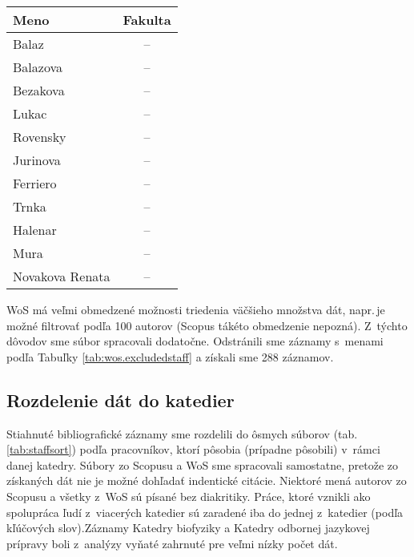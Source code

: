 \begin{SCtable}
\caption{Mená pracovníkov, ktorí nepatria do Fakulty prírodných vied.}
\label{tab:wos.excludedstaff}
\centering\small
\begin{tabular}{lc}
  \toprule\noalign{\vspace{.3ex}}
  Meno            & Fakulta \\[0.3ex]
  \midrule\noalign{\vspace{.5ex}}
  Balaz           & -- \\
  Balazova        & -- \\
  Bezakova        & -- \\
  Lukac           & -- \\
  Rovensky        & -- \\[1ex]
  Jurinova        & -- \\
  Ferriero        & -- \\
  Trnka           & -- \\
  Halenar         & -- \\
  Mura            & -- \\[1ex]
  Novakova Renata & -- \\[0.5ex]
  \bottomrule
\end{tabular}
\end{SCtable}

WoS má veľmi obmedzené možnosti triedenia väčšieho množstva dát, napr.\,je možné
filtrovať podľa 100 autorov (Scopus tákéto obmedzenie nepozná).  Z~týchto
dôvodov sme súbor  spracovali dodatočne.
Odstránili sme záznamy s~menami podľa Tabuľky \ref{tab:wos.excludedstaff} a
získali sme 288 záznamov.


\subsection{Rozdelenie dát do katedier}

Stiahnuté bibliografické záznamy sme rozdelili do ôsmych súborov
(tab.\,\ref{tab:staffsort}) podľa pracovníkov, ktorí pôsobia (prípadne pôsobili)
v~rámci danej katedry.  Súbory zo Scopusu a WoS sme spracovali samostatne,
pretože zo získaných dát nie je možné dohľadať indentické citácie.  Niektoré
mená autorov zo Scopusu a všetky z~WoS sú písané bez diakritiky.  Práce, ktoré
vznikli ako spolupráca ľudí z~viacerých katedier sú zaradené iba do jednej
z~katedier (podľa kľúčových slov).Záznamy Katedry biofyziky a Katedry odbornej
jazykovej prípravy boli z~analýzy vyňaté zahrnuté pre veľmi nízky počet dát.


